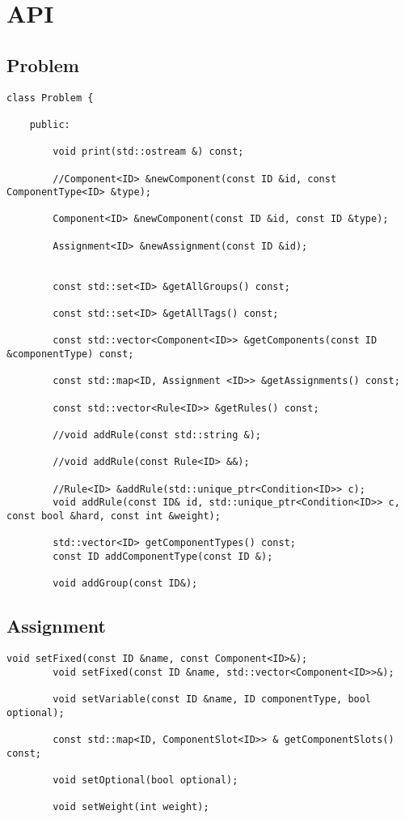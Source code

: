 \section{API}

\subsection{Problem}
\begin{verbatim}
class Problem {

    public:

        void print(std::ostream &) const;

        //Component<ID> &newComponent(const ID &id, const ComponentType<ID> &type);

        Component<ID> &newComponent(const ID &id, const ID &type);

        Assignment<ID> &newAssignment(const ID &id);


        const std::set<ID> &getAllGroups() const;

        const std::set<ID> &getAllTags() const;

        const std::vector<Component<ID>> &getComponents(const ID &componentType) const;

        const std::map<ID, Assignment <ID>> &getAssignments() const;

        const std::vector<Rule<ID>> &getRules() const;

        //void addRule(const std::string &);

        //void addRule(const Rule<ID> &&);

        //Rule<ID> &addRule(std::unique_ptr<Condition<ID>> c);
        void addRule(const ID& id, std::unique_ptr<Condition<ID>> c, const bool &hard, const int &weight);

        std::vector<ID> getComponentTypes() const;
        const ID addComponentType(const ID &);

        void addGroup(const ID&);
\end{verbatim}        
        
        
\subsection{Assignment}
\begin{verbatim}
void setFixed(const ID &name, const Component<ID>&);
        void setFixed(const ID &name, std::vector<Component<ID>>&);

        void setVariable(const ID &name, ID componentType, bool optional);

        const std::map<ID, ComponentSlot<ID>> & getComponentSlots() const;

        void setOptional(bool optional);

        void setWeight(int weight);
\end{verbatim}


